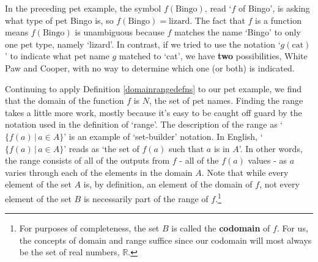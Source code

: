 \documentclass{ximera}
\begin{document}
\begin{image}
\end{image}
\begin{center}
\end{center}

In the preceding pet example, the symbol $f(\text{Bingo})$, read `$f$ of Bingo', is asking what type of pet Bingo is, so $f(\text{Bingo}) = \text{lizard}$.  The fact that $f$ is a function means $f(\text{Bingo})$ is unambiguous because $f$ matches the name `Bingo' to only one pet type, namely `lizard'. In contrast, if we tried to use the notation `$g(\text{cat})$' to indicate what pet name $g$ matched to `cat', we have \textbf{two} possibilities, White Paw and Cooper, with no way to determine which one (or both) is indicated.  

Continuing to apply Definition \ref{domainrangedefns} to our pet example, we find that the domain of the function $f$ is $N$, the set of pet names.  Finding the range takes a little more work, mostly because it's easy to be caught off guard by the notation used in the definition of `range'.  The description of the range as `$\{ f(a) \, | \, a \in A \}$' is an example of `set-builder' notation.  In English,  `$\{ f(a) \, | \, a \in A \}$'  reads as `the set of $f(a)$ such that $a$ is in $A$'.  In other words, the range consists of all of the outputs from $f$ - all of the $f(a)$ values - as $a$ varies through each of the elements in the domain $A$.   Note that while every element of the set $A$ is, by definition, an element of the domain of $f$, not every element of the set $B$ is necessarily part of the range of $f$.\footnote{For purposes of completeness, the set $B$ is called the  \textbf{codomain} of $f$.  For us, the concepts of domain and range suffice since our codomain will most always be the set of real numbers, $\mathbb{R}$.}
\end{document}
